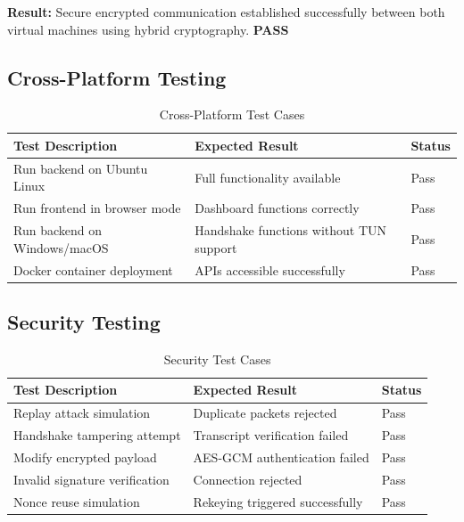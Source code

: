\textbf{Result:} Secure encrypted communication established successfully between both virtual machines using hybrid cryptography. \textbf{PASS}

\subsection{Cross-Platform Testing}

\begin{table}[H]
\centering
\begin{tabularx}{\textwidth}{|X|X|l|}
\hline
\textbf{Test Description} & \textbf{Expected Result} & \textbf{Status} \\ \hline
Run backend on Ubuntu Linux & Full functionality available & Pass \\ \hline
Run frontend in browser mode & Dashboard functions correctly & Pass \\ \hline
Run backend on Windows/macOS & Handshake functions without TUN support & Pass \\ \hline
Docker container deployment & APIs accessible successfully & Pass \\ \hline
\end{tabularx}
\caption{Cross-Platform Test Cases}
\end{table}

\subsection{Security Testing}

\begin{table}[H]
\centering
\begin{tabularx}{\textwidth}{|X|X|l|}
\hline
\textbf{Test Description} & \textbf{Expected Result} & \textbf{Status} \\ \hline
Replay attack simulation & Duplicate packets rejected & Pass \\ \hline
Handshake tampering attempt & Transcript verification failed & Pass \\ \hline
Modify encrypted payload & AES-GCM authentication failed & Pass \\ \hline
Invalid signature verification & Connection rejected & Pass \\ \hline
Nonce reuse simulation & Rekeying triggered successfully & Pass \\ \hline
\end{tabularx}
\caption{Security Test Cases}
\end{table}

